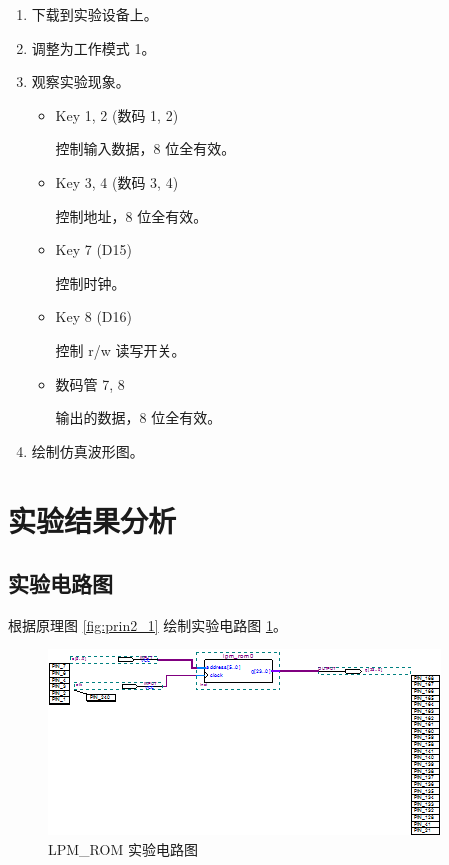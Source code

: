 \begin{enumerate}
    
    \item 下载到实验设备上。
    \item 调整为工作模式 1。
    \item 观察实验现象。
    
    \begin{itemize}
        \item Key 1, 2 (数码 1, 2)
        
        控制输入数据，8 位全有效。
        
        \item Key 3, 4 (数码 3, 4)
        
        控制地址，8 位全有效。
        
        \item Key 7 (D15)
        
        控制时钟。
        
        \item Key 8 (D16)
        
        控制 r/w 读写开关。
        
        \item 数码管 7, 8
        
        输出的数据，8 位全有效。
        
    \end{itemize}
    \item 绘制仿真波形图。
\end{enumerate}


\section{实验结果分析}

\subsection{实验电路图}

根据原理图 \ref{fig:prin2_1} 绘制实验电路图 \ref{fig:bdf2_1}。

\begin{figure}[H]
\centering
\includegraphics[width=\textwidth]{images/bdf2_1.png}
\caption{LPM\_ROM 实验电路图}
\label{fig:bdf2_1}
\end{figure}

